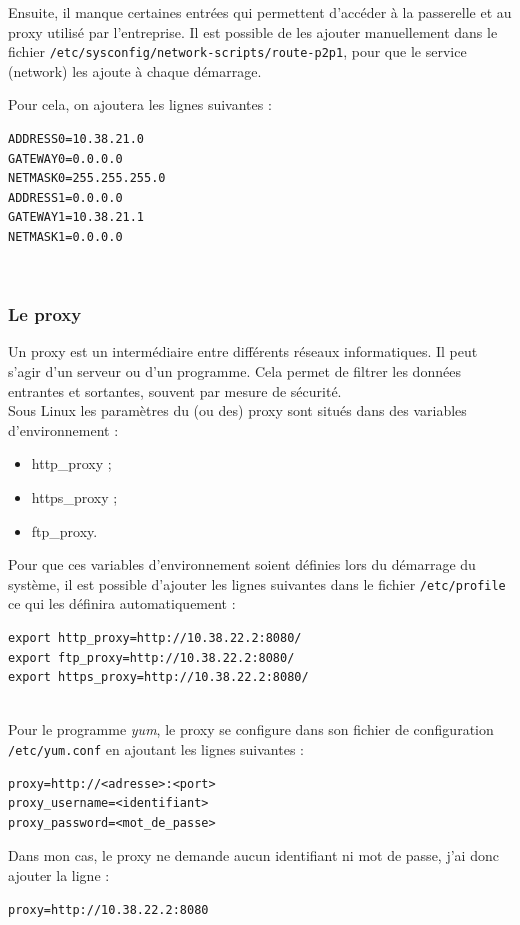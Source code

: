 Ensuite, il manque certaines entrées qui permettent d'accéder à la passerelle et au proxy utilisé par l'entreprise.
Il est possible de les ajouter manuellement dans le fichier \lstinline{/etc/sysconfig/network-scripts/route-p2p1}, pour que le service (network) les ajoute à chaque démarrage.

Pour cela, on ajoutera les lignes suivantes :
\begin{lstlisting}
ADDRESS0=10.38.21.0
GATEWAY0=0.0.0.0
NETMASK0=255.255.255.0
ADDRESS1=0.0.0.0
GATEWAY1=10.38.21.1
NETMASK1=0.0.0.0
\end{lstlisting}
~~\\




\subsubsection{Le proxy}

Un proxy est un intermédiaire entre différents réseaux informatiques.
Il peut s'agir d'un serveur ou d'un programme.
Cela permet de filtrer les données entrantes et sortantes, souvent par mesure de sécurité.
\\


Sous Linux les paramètres du (ou des) proxy sont situés dans des variables d'environnement :
\begin{itemize}
	\item http\_proxy ;
	\item https\_proxy ;
	\item ftp\_proxy.
\end{itemize}

Pour que ces variables d'environnement soient définies lors du démarrage du système, il est possible d'ajouter les lignes suivantes dans le fichier \lstinline{/etc/profile} ce qui les définira automatiquement :
\begin{lstlisting}
export http_proxy=http://10.38.22.2:8080/
export ftp_proxy=http://10.38.22.2:8080/
export https_proxy=http://10.38.22.2:8080/
\end{lstlisting}
~~\\


Pour le programme \textit{yum}, le proxy se configure dans son fichier de configuration \lstinline{/etc/yum.conf} en ajoutant les lignes suivantes :
\begin{lstlisting}
proxy=http://<adresse>:<port>
proxy_username=<identifiant>
proxy_password=<mot_de_passe>
\end{lstlisting}
Dans mon cas, le proxy ne demande aucun identifiant ni mot de passe, j'ai donc ajouter la ligne :
\begin{lstlisting}
proxy=http://10.38.22.2:8080
\end{lstlisting}
~~\\





